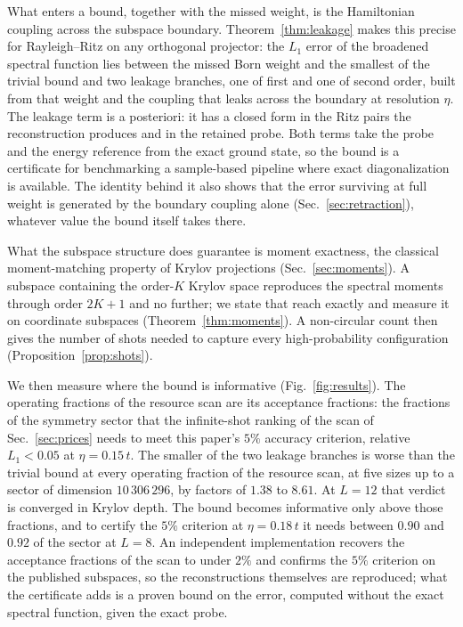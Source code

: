 What enters a bound, together with the missed weight, is the Hamiltonian coupling across the
subspace boundary. Theorem~\ref{thm:leakage} makes this precise for Rayleigh--Ritz on any
orthogonal projector: the $L_1$ error of the broadened spectral function lies between the missed
Born weight and the smallest of the trivial bound and two leakage branches, one of first and one of second
order, built from that weight and
the coupling that leaks across the boundary at resolution $\eta$. The leakage term is a posteriori:
it has a closed form in the Ritz pairs the reconstruction produces and in the retained
probe. Both terms take the probe and the energy reference from the exact ground state, so the bound
is a certificate for benchmarking a sample-based pipeline where exact diagonalization is available. The identity behind it also shows that the error surviving at full
weight is generated by the boundary coupling alone (Sec.~\ref{sec:retraction}), whatever
value the bound itself takes there.

What the subspace structure does guarantee is moment exactness, the classical moment-matching
property of Krylov projections (Sec.~\ref{sec:moments}). A subspace containing the order-$K$ Krylov
space reproduces the spectral moments through order $2K+1$ and no further; we state that reach
exactly and measure it on coordinate subspaces (Theorem~\ref{thm:moments}). A non-circular count
then gives the number of shots needed to capture every high-probability configuration
(Proposition~\ref{prop:shots}).

%
%
%
%
%
%
%
%
%
%
%
%
%
%
%
%
%
%
%
%
%
%
%
%
%
%
%
We then measure where the bound is informative (Fig.~\ref{fig:results}). The operating fractions of
the resource scan are its acceptance fractions: the fractions of the symmetry sector that the
infinite-shot ranking of the scan of Sec.~\ref{sec:prices} needs to meet this paper's $5\%$ accuracy
criterion, relative $L_1<0.05$ at $\eta=0.15\,t$. The smaller of the two leakage branches is worse than the
trivial bound at every operating fraction of the resource scan, at five sizes up to a sector of
dimension $10\,306\,296$, by factors of $1.38$ to $8.61$. At $L=12$ that verdict is converged in
Krylov depth. The bound becomes informative only above those fractions, and to certify the
$5\%$ criterion at $\eta=0.18\,t$ it needs between $0.90$ and $0.92$ of the sector at $L=8$. An independent implementation recovers
the acceptance fractions of the scan to under $2\%$ and confirms the $5\%$ criterion on the
published subspaces, so the reconstructions themselves are reproduced; what the certificate adds is a
proven bound on the error, computed without the exact spectral function, given the exact probe.

